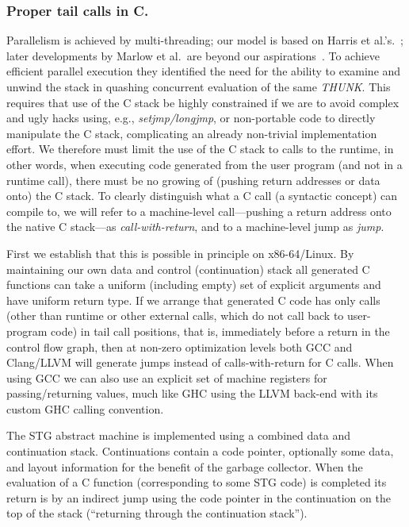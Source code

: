 \documentclass{llncs}
\begin{document}
\subsubsection{Proper tail calls in C.}
Parallelism is achieved by multi-threading; our model is based on Harris et
al.'s.~\cite{Harris:2005}; later developments by Marlow et al.\ are beyond our
aspirations~\cite{Marlow:2009,Marlow:2011}.  To achieve efficient parallel
execution they identified the need for the ability to examine and unwind the
stack in quashing concurrent evaluation of the same \emph{THUNK}\@.  This
requires that use of the C stack be highly constrained if we are to avoid
complex and ugly hacks using, e.g., \emph{setjmp/longjmp}, or non-portable
code to directly manipulate the C stack, complicating an already non-trivial
implementation effort.  We therefore must limit the use of the C stack to
calls to the runtime, in other words, when executing code generated from the
user program (and not in a runtime call), there must be no growing of (pushing
return addresses or data onto) the C stack.
%
To clearly distinguish what a C call (a syntactic concept) can compile to, we
will refer to a machine-level call---pushing a return address onto the native
C stack---as \emph{call-with-return}, and to a machine-level jump as
\emph{jump}.

First we establish that this is possible in principle on x86-64/Linux.  By
maintaining our own data and control (continuation) stack all generated C
functions can take a uniform (including empty) set of explicit arguments and
have uniform return type. If we arrange that generated C code has only calls
(other than runtime or other external calls, which do not call back to
user-program code) in tail call positions, that is, immediately before a
return in the control flow graph, then at non-zero optimization levels both
GCC and Clang/LLVM will generate jumps instead of calls-with-return for C
calls.  When using GCC we can also use an explicit set of machine registers
for passing/returning values, much like GHC using the LLVM back-end with its
custom GHC calling convention.

The STG abstract machine is implemented using a combined data and continuation stack.
Continuations contain a code pointer, optionally some data, and layout
information for the benefit of the garbage collector.  
When the evaluation of a C function (corresponding to some STG code) is
completed its return is by an indirect jump using the code pointer in the
continuation on the top of the stack (``returning through the continuation
stack'').
\end{document}
